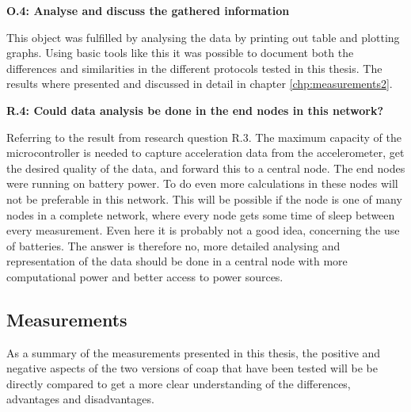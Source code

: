 \noindent\textbf{O.4: Analyse and discuss the gathered information}

\noindent This object was fulfilled by analysing the data by printing out table and plotting graphs. Using basic tools like this it was possible to document both the differences and similarities in the different protocols tested in this thesis. The results where presented and discussed in detail in chapter \ref{chp:measurements2}.

\noindent\textbf{R.4: Could data analysis be done in the end nodes in this network?}

\noindent Referring to the result from research question R.3. The maximum capacity of the \gls{microcontroller} is needed to capture acceleration data from the accelerometer, get the desired quality of the data, and forward this to a central node. The end nodes were running on battery power. To do even more calculations in these nodes will not be preferable in this network. This will be possible if the node is one of many nodes in a complete network, where every node gets some time of sleep between every measurement. Even here it is probably not a good idea, concerning the use of batteries. The answer is therefore no, more detailed analysing and representation of the data should be done in a central node with more computational power and better access to power sources. 

\newpage
\subsection{Measurements}


\noindent As a summary of the measurements presented in this thesis, the positive and negative aspects of the two versions of \gls{coap} that have been tested will be be directly compared to get a more clear understanding of the differences, advantages and disadvantages.


